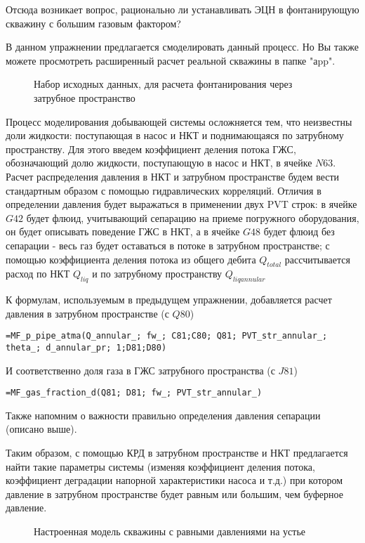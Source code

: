 Отсюда возникает вопрос, рационально ли устанавливать ЭЦН в фонтанирующую скважину с большим газовым фактором?

В данном упражнении предлагается смоделировать данный процесс. Но Вы также можете просмотреть расширенный расчет реальной скважины в папке "аpp".

\begin{figure}[h!]
	\center{\texttt{[image: Ex110\_1]}}
	\caption{Набор исходных данных, для расчета фонтанирования через затрубное пространство}
	\label{ris:Ex110_1}
\end{figure}

Процесс моделирования добывающей системы осложняется тем, что неизвестны доли жидкости: поступающая в насос и НКТ и поднимающаяся по затрубному пространству. Для этого введем коэффициент деления потока ГЖС, обозначающий долю жидкости, поступающую в насос и НКТ, в ячейке $N63$. Расчет распределения давления в НКТ и затрубном пространстве будем вести стандартным образом с помощью гидравлических корреляций. Отличия в определении давления будет выражаться в применении двух PVT строк: в ячейке $G42$ будет флюид, учитывающий сепарацию на приеме погружного оборудования, он будет описывать поведение ГЖС в НКТ, а в ячейке $G48$ будет флюид без сепарации - весь газ будет оставаться в потоке в затрубном пространстве; с помощью коэффициента деления потока из общего дебита $Q_{total}$ рассчитывается расход по НКТ $Q_{liq}$ и по затрубному  пространству $Q_{liq annular}$

К формулам, используемым в предыдущем упражнении, добавляется расчет давления в затрубном пространстве (с $Q80$)

{ \small  \texttt{=MF\_p\_pipe\_atma(Q\_annular\_; fw\_; C81;C80; Q81; PVT\_str\_annular\_; theta\_; d\_annular\_pr; 1;D81;D80)
}}

И соответственно доля газа в ГЖС затрубного пространства (с $J81$) 

{ \small  \texttt{=MF\_gas\_fraction\_d(Q81; D81; fw\_; PVT\_str\_annular\_)
}}

Также напомним о важности правильно определения давления сепарации (описано выше). 

Таким образом, с помощью КРД в затрубном пространстве и НКТ предлагается найти такие параметры системы (изменяя коэффициент деления потока, коэффициент деградации напорной характеристики насоса и т.д.) при котором давление в затрубном пространстве будет равным или большим, чем буферное давление.

\begin{figure}[h!]
	\center{\texttt{[image: Ex110\_2]}}
	\caption{Настроенная модель скважины с равными давлениями на устье}
	\label{ris:Ex110_2}
\end{figure}


